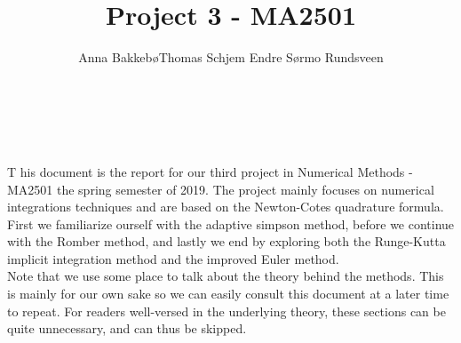 \documentclass[12pt, a4paper,usenames,dvipsnames]{article}
\title{Project 3 - MA2501}
\author{Anna Bakkebø\And Thomas Schjem \And Endre Sørmo Rundsveen}
\begin{document}
\begin{titlepage}
  
    {\noindent \Huge {}}\\
    
    {\noindent\large \color{Brown}{Anna Bakkebø\\Thomas Schjem\\Endre Sørmo Rundsveen}}\\
    \raggedright
    \hfill \break
    \lettrine[lraise=0.15]{T}{} his document is the report for our third project in Numerical Methods - MA2501 the spring semester of 2019. The project mainly focuses on numerical integrations techniques and are based on the Newton-Cotes quadrature formula. First we familiarize ourself with the adaptive simpson method, before we continue with the Romber method, and lastly we end by exploring both the Runge-Kutta implicit integration method and the improved Euler method. \\ 
    \hspace{10pt}Note that we use some place to talk about the theory behind the methods. This is mainly for our own sake so we can easily consult this document at a later time to repeat. For readers well-versed in the underlying theory, these sections can be quite unnecessary, and can thus be skipped. 
\end{titlepage}
\restoregeometry
\end{document}
